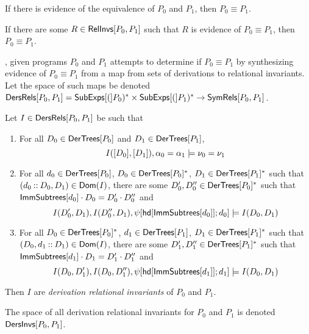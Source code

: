 \begin{ex}
  \label{ex:rel-invs}
\end{ex}

If there is evidence of the equivalence of $P_0$ and $P_1$, then $P_0
\equiv P_1$.
%
\begin{lemma}
  \label{lemma:equiv-evidence}
  If there are some $R \in \mathsf{RelInvs}[ P_0, P_1 ]$ such that $R$ is
  evidence of $P_0 \equiv P_1$, then $P_0 \equiv P_1$.
\end{lemma}

\sys, given programs $P_0$ and $P_1$ attempts to determine if $P_0
\equiv P_1$ by synthesizing evidence of $P_0 \equiv P_1$ from a map
from sets of derivations to relational invariants.
%
Let the space of such maps be denoted $\mathsf{DersRels}[ P_0, P_1 ] =
\mathsf{SubExps}[ ( ]P_0)^{*} \times \mathsf{SubExps}[ ( ]P_1)^{*} \to \mathsf{SymRels}[ P_0, P_1 ]$.
%
\begin{defn}
  \label{defn:der-rel-invs}
  Let $I \in \mathsf{DersRels}[ P_0, P_1 ]$ be such that %
  \begin{enumerate}
  \item 
    For all $D_0 \in \mathsf{DerTrees}[ P_0 ]$ and $D_1 \in \mathsf{DerTrees}[ P_1 ]$,
    \[ I([ D_0 ], [ D_1 ]), \alpha_0 = \alpha_1 \entails %
    \nu_0 = \nu_1 \]
  \item 
    For all $d_0 \in \mathsf{DerTrees}[ P_0 ]$, %
    $D_0 \in \mathsf{DerTrees}[ P_0 ]^{*}$, %
    $D_1 \in \mathsf{DerTrees}[ P_1 ]^{*}$ such that $(d_0 \mathbin{::} D_0, D_1) \in
    \mathsf{Dom}(I)$, %
    there are some $D_0', D_0'' \in \mathsf{DerTrees}[ P_0 ]^{*}$ such that
    $\mathsf{ImmSubtrees}[ d_0 ] \cdot D_0 = D_0' \cdot D_0''$ and %
    \[ I(D_0', D_1), I(D_0'', D_1), %
    \symstep{ \head{ \immsubtrees{ d_0 } } }{ d_0 } \entails %
    I(D_0, D_1) \]
  \item 
    For all $D_0 \in \mathsf{DerTrees}[ P_0 ]^{*}$, %
    $d_1 \in \mathsf{DerTrees}[ P_1 ]$, %
    $D_1 \in \mathsf{DerTrees}[ P_1 ]^{*}$ such that $(D_0, d_1 \mathbin{::} D_1) \in
    \mathsf{Dom}(I)$, %
    there are some $D_1', D_1'' \in \mathsf{DerTrees}[ P_1 ]^{*}$ such that
    $\mathsf{ImmSubtrees}[ d_1 ] \cdot D_1 = D_1' \cdot D_1''$ and %
    \[ I(D_0, D_1'), I(D_0, D_1''), %
    \symstep{ \head { \immsubtrees{ d_1 } } }{ d_1 } \entails %
    I(D_0, D_1) \]
  \end{enumerate}
  Then $I$ are \emph{derivation relational invariants} of $P_0$ and
  $P_1$.
\end{defn}
%
The space of all derivation relational invariants for $P_0$ and $P_1$
is denoted $\mathsf{DersInvs}[ P_0, P_1 ]$.
%

